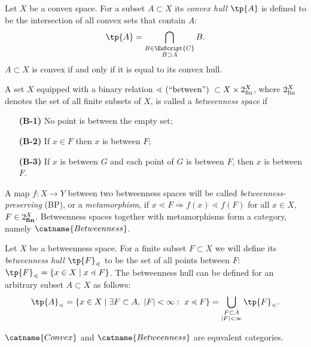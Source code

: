 \documentclass[12pt, a4paper]{article}
\newcommand{\C}{\EuScript{C}}
\newcommand{\btw}{\lessdot}
\begin{document}
\begin{definition}
    Let \(X\) be a convex space. For a subset \(A \subset X\) its \textit{convex hull} \(\tp{A}\) is defined to be the intersection of all convex sets that contain \(A\): \[\tp{A} = \bigcap\limits_{\substack{B \in \C \\ B \supset A}} B.\] \(A \subset X\) is convex if and only if it is equal to its convex hull.
\end{definition}


\begin{definition}\label{def-btw}
    A set \(X\) equipped with a binary relation \(\btw \hbox{ (``between'') } \subset X \times 2^X_{\rm fin}\), where \(2^X_{\rm fin}\) denotes the set of all finite subsets of \(X\), is called a \textit{betweenness space} if

    \begin{itemize}
        \item[\bf (B-1)] No point is between the empty set;
        \item[\bf (B-2)] If \(x \in F\) then \(x\) is between \(F\);
        \item[\bf (B-3)] If \(x\) is between \(G\) and each point of \(G\) is between \(F\), then \(x\) is between \(F\).  
    \end{itemize}

    A map \(f \colon X \to Y\) between two betweenness spaces will be called \textit{betweenness-preserving} (BP), or a \textit{metamorphism}, if \(x \btw F \Rightarrow f(x) \btw f(F)\) for all \(x \in X\), \(F \in 2^X_{\bf fin}\). Betweenness spaces together with metamorphisms form a category, namely \(\catname{Betweenness}\).
\end{definition}

\begin{definition}
    Let \(X\) be a betweenness space. For a finite subset \(F \subset X\) we will define its \textit{betweenness hull} \(\tp{F}_\btw\) to be the set of all points between \(F\): \(\tp{F}_\btw = \{x \in X \mid x \btw F\}\). The betweenness hull can be defined for an arbitrary subset \(A \subset X\) as follows: \[\tp{A}_\btw = \{x \in X \mid \exists F \subset A,\ |F| < \infty: \ x \btw F\} = \bigcup\limits_{\substack{F \subset A \\ |F| < \infty}} \tp{F}_\btw.\]
\end{definition}

\begin{theorem}\label{th-equivalent}
    \(\catname{Convex}\) and \(\catname{Betweenness}\) are equvalent categories.
\end{theorem}
\end{document}
